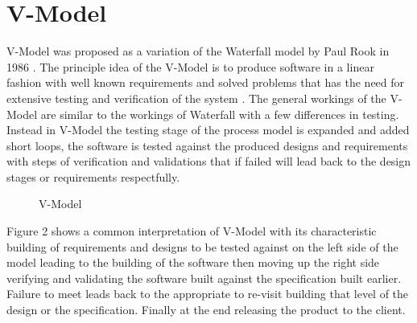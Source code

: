 \documentclass{style/CRPITStyle}
\renewcommand{\cite}{\citep}
\begin{document}
\section{V-Model} %

V-Model was proposed as a variation of the Waterfall model by Paul Rook in 1986
\cite{Rook:1986}.
The principle idea of the V-Model is to produce software in a linear fashion with
well known requirements and solved problems that has the need for extensive testing 
and verification of the system \cite{Rook:1986}.
The general workings of the V-Model are similar to the workings of Waterfall
with a few differences in testing.
Instead in V-Model the testing stage of the process model is expanded and added short loops,
the software is tested against the produced designs and requirements with
steps of verification and validations  that if failed will lead back to the design
stages or requirements respectfully.

\begin{figure}[htb]
\caption{\protect\label{xyz}  V-Model}
\end{figure}

Figure 2 shows a common interpretation of V-Model with its characteristic
building of requirements and designs to be tested against on the left side of
the model leading to the building of the software then moving up the right side
verifying and validating the software built against the specification built
earlier. Failure to meet leads back to the appropriate to re-visit building that
level of the design or the specification. Finally at the end releasing the
product to the client.

\vspace{.1in}
\end{document}
